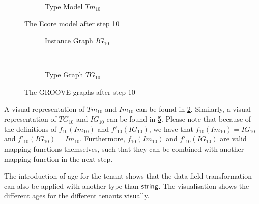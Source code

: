 \begin{figure}[p]
\begin{subfigure}{0.98\textwidth}
        \caption{Type Model $Tm_{10}$}
        \label{fig:application:building_the_model:tenant_ages:ecore:type_model}
    \end{subfigure}
    \caption{The Ecore model after step 10}
    \label{fig:application:building_the_model:tenant_ages:ecore}
\end{figure}

\begin{figure}[p]
    \centering
    \begin{subfigure}{0.98\textwidth}
        \centering
        
        \caption{Instance Graph $IG_{10}$}
        \label{fig:application:building_the_model:tenant_ages:groove:instance_graph}
    \end{subfigure}
    \\
    \begin{subfigure}{0.98\textwidth}
        \centering
        
        \caption{Type Graph $TG_{10}$}
        \label{fig:application:building_the_model:tenant_ages:groove:type_graph}
    \end{subfigure}
    \caption{The GROOVE graphs after step 10}
    \label{fig:application:building_the_model:tenant_ages:groove}
\end{figure}

A visual representation of $Tm_{10}$ and $Im_{10}$ can be found in \cref{fig:application:building_the_model:tenant_ages:ecore}. Similarly, a visual representation of $TG_{10}$ and $IG_{10}$ can be found in \cref{fig:application:building_the_model:tenant_ages:groove}. Please note that because of the definitions of $f_{10}(Im_{10})$ and $f'_{10}(IG_{10})$, we have that $f_{10}(Im_{10}) = IG_{10}$ and $f'_{10}(IG_{10}) = Im_{10}$. Furthermore, $f_{10}(Im_{10})$ and $f'_{10}(IG_{10})$ are valid mapping functions themselves, such that they can be combined with another mapping function in the next step.

The introduction of age for the tenant shows that the data field transformation can also be applied with another type than $\mathsf{string}$. The visualisation shows the different ages for the different tenants visually.

\afterpage{\FloatBarrier}